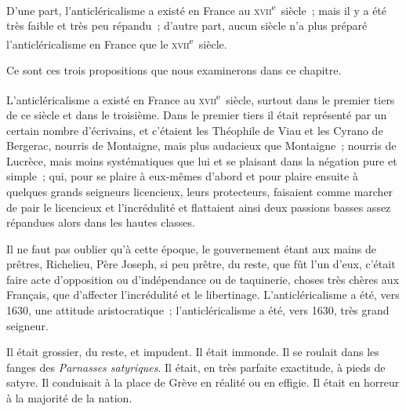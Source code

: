 \documentclass[french,twoside]{book} %
\newcommand{\astertri}{\medskip\par\centerline{\color{rubric}\large\selectfont{\syms ✻\,✻\,✻}}\medskip\par}%
\begin{document}
\noindent D’une part, l’anticléricalisme a existé en France au \textsc{xvii}\textsuperscript{e} siècle ; mais il y a été très faible et très peu répandu ; d’autre part, aucun siècle n’a plus préparé l’anticléricalisme en France que le \textsc{xvii}\textsuperscript{e} siècle.\par
Ce sont ces trois propositions que nous examinerons dans ce chapitre.\par
L’anticléricalisme a existé en France au \textsc{xvii}\textsuperscript{e} siècle, surtout dans le premier tiers de ce siècle et dans le troisième. Dans le premier tiers il était représenté par un certain nombre d’écrivains, et c’étaient les Théophile de Viau et les Cyrano de Bergerac, nourris de Montaigne, mais plus audacieux que Montaigne ; nourris de Lucrèce, mais moins systématiques que lui et se plaisant dans la négation pure et simple ; qui, pour se plaire à eux-mêmes d’abord et pour plaire ensuite à quelques grands seigneurs licencieux, leurs protecteurs, faisaient comme marcher de pair le licencieux et  l’incrédulité et flattaient ainsi deux passions basses assez répandues alors dans les hautes classes.\par
Il ne faut pas oublier qu’à cette époque, le gouvernement étant aux mains de prêtres, Richelieu, Père Joseph, si peu prêtre, du reste, que fût l’un d’eux, c’était faire acte d’opposition ou d’indépendance ou de taquinerie, choses très chères aux Français, que d’affecter l’incrédulité et le libertinage. L’anticléricalisme a été, vers 1630, une attitude aristocratique ; l’anticléricalisme a été, vers 1630, très grand seigneur.\par
Il était grossier, du reste, et impudent. Il était immonde. Il se roulait dans les fanges des \emph{Parnasses satyriques}. Il était, en très parfaite exactitude, à pieds de satyre. Il conduisait à la place de Grève en réalité ou en effigie. Il était en horreur à la majorité de la nation.\par

\astertri
\end{document}
